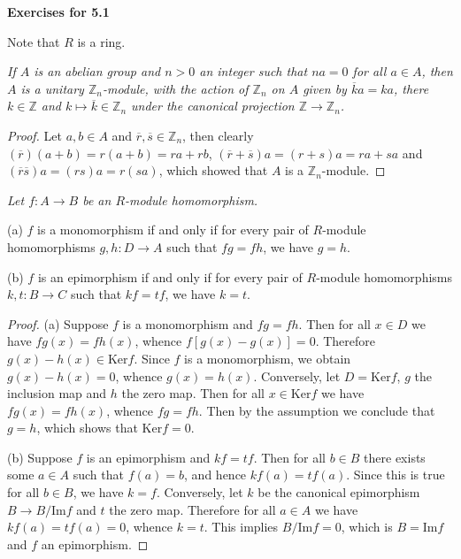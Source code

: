 \begin{center}
\begin{large}
    \textbf{Exercises for 5.1}
\end{large}
\end{center}
Note that $R$ is a ring.
\begin{problem}\em
If $A$ is an abelian group and $n>0$ an integer such that $na=0$ for all $a\in A$, then $A$ is a unitary $\mathbb{Z}_n$-module, with the action of $\mathbb{Z}_n$ on $A$ given by $\overline{k}a=ka$, there $k\in\mathbb{Z}$ and $k\mapsto\overline{k}\in\mathbb{Z}_n$ under the canonical projection $\mathbb{Z}\to\mathbb{Z}_n$.
\end{problem}
\begin{proof}
Let $a,b\in A$ and $\overline{r},\overline{s}\in\mathbb{Z}_n$, then clearly $(\overline{r})(a+b)=r(a+b)=ra+rb$, $(\overline{r}+\overline{s})a=(r+s)a=ra+sa$ and $(\overline{r}\overline{s})a=(rs)a=r(sa)$, which showed that $A$ is a $\mathbb{Z}_n$-module.
\end{proof}
\begin{problem}\em
Let $f:A\to B$ be an $R$-module homomorphism.\par
(a) $f$ is a monomorphism if and only if for every pair of $R$-module homomorphisms $g,h:D\to A$ such that $fg=fh$, we have $g=h$.\par
(b) $f$ is an epimorphism if and only if for every pair of $R$-module homomorphisms $k,t:B\to C$ such that $kf=tf$, we have $k=t$.
\end{problem}
\begin{proof}
(a) Suppose $f$ is a monomorphism and $fg=fh$. Then for all $x\in D$ we have $fg(x)=fh(x)$, whence $f[g(x)-g(x)]=0$. Therefore $g(x)-h(x)\in\mathrm{Ker}f$. Since $f$ is a monomorphism, we obtain $g(x)-h(x)=0$, whence $g(x)=h(x)$. Conversely, let $D=\mathrm{Ker}f$, $g$ the inclusion map and $h$ the zero map. Then for all $x\in\mathrm{Ker}f$ we have $fg(x)=fh(x)$, whence $fg=fh$. Then by the assumption we conclude that $g=h$, which shows that $\mathrm{Ker}f=0$.\par
(b) Suppose $f$ is an epimorphism and $kf=tf$. Then for all $b\in B$ there exists some $a\in A$ such that $f(a)=b$, and hence $kf(a)=tf(a)$. Since this is true for all $b\in B$, we have $k=f$. Conversely, let $k$ be the canonical epimorphism $B\to B/\mathrm{Im}f$ and $t$ the zero map. Therefore for all $a\in A$ we have $kf(a)=tf(a)=0$, whence $k=t$. This implies $B/\mathrm{Im}f=0$, which is $B=\mathrm{Im}f$ and $f$ an epimorphism.
\end{proof}
